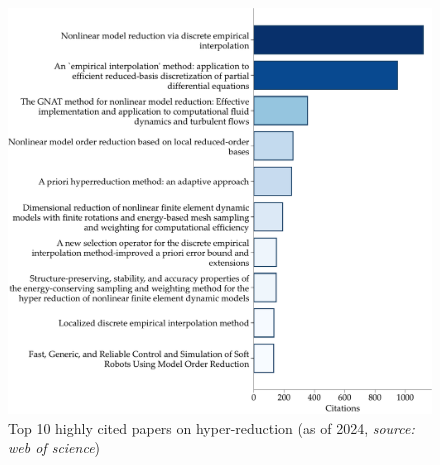 \documentclass[11pt]{article}
\begin{document}
    \begin{figure}[t]
        	    \centering
        	    \includegraphics[width=0.8\linewidth]{papers.pdf}
        	    \caption{Top 10 highly cited papers on hyper-reduction (as of 2024, \textit{source: web of science}) \cite{chaturantabut2010nonlinear,barrault2004empirical,carlberg2013gnat,amsallem2012nonlinear,ryckelynck2005priori,farhat2014dimensional,drmac2016new,farhat2015structure-preserving,peherstorfer2014localized,goury2018fast}}
        \label{fig:citations}
    \end{figure}
\end{document}
